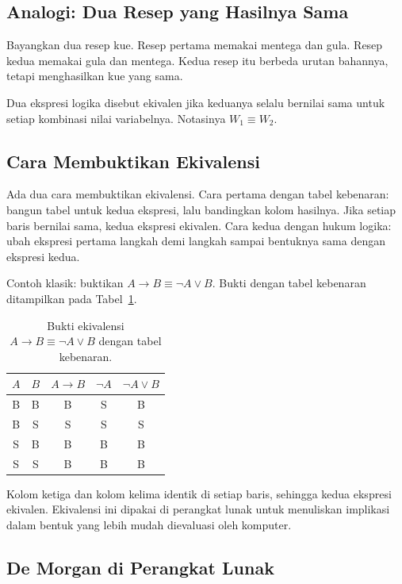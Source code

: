 \documentclass[11pt,a4paper]{article}
\begin{document}
\subsection{Analogi: Dua Resep yang Hasilnya Sama}

Bayangkan dua resep kue. Resep pertama memakai mentega dan gula. Resep kedua memakai gula dan mentega. Kedua resep itu berbeda urutan bahannya, tetapi menghasilkan kue yang sama.

Dua ekspresi logika disebut ekivalen jika keduanya selalu bernilai sama untuk setiap kombinasi nilai variabelnya. Notasinya $W_1 \equiv W_2$.

\subsection{Cara Membuktikan Ekivalensi}

Ada dua cara membuktikan ekivalensi. Cara pertama dengan tabel kebenaran: bangun tabel untuk kedua ekspresi, lalu bandingkan kolom hasilnya. Jika setiap baris bernilai sama, kedua ekspresi ekivalen. Cara kedua dengan hukum logika: ubah ekspresi pertama langkah demi langkah sampai bentuknya sama dengan ekspresi kedua.

Contoh klasik: buktikan $A \to B \equiv \neg A \vee B$. Bukti dengan tabel kebenaran ditampilkan pada Tabel~\ref{tab:ekivalensi-implikasi}.

\begin{table}[H]
	\centering
	\caption{Bukti ekivalensi $A \to B \equiv \neg A \vee B$ dengan tabel kebenaran.}
	\label{tab:ekivalensi-implikasi}
	\small
	\begin{tabular}{c c c c c}
		\toprule
		$A$ & $B$ & $A \to B$ & $\neg A$ & $\neg A \vee B$ \\
		\midrule
		B & B & B & S & B \\
		B & S & S & S & S \\
		S & B & B & B & B \\
		S & S & B & B & B \\
		\bottomrule
	\end{tabular}
\end{table}

Kolom ketiga dan kolom kelima identik di setiap baris, sehingga kedua ekspresi ekivalen. Ekivalensi ini dipakai di perangkat lunak untuk menuliskan implikasi dalam bentuk yang lebih mudah dievaluasi oleh komputer.

\subsection{De Morgan di Perangkat Lunak}
\end{document}
